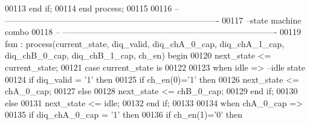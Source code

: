 \begin{DoxyCode}
00113     \textcolor{keywordflow}{end} \textcolor{keywordflow}{if}; 
00114 \textcolor{keywordflow}{end} \textcolor{keywordflow}{process};
00115 
00116 \textcolor{keyword}{-- ----------------------------------------------------------------------------}
00117 \textcolor{keyword}{--state machine combo}
00118 \textcolor{keyword}{-- ----------------------------------------------------------------------------}
00119 fsm : \textcolor{keywordflow}{process}(current_state, diq_valid, diq_chA_0_cap, diq_chA_1_cap, 
      diq_chB_0_cap, diq_chB_1_cap, ch_en) \textcolor{keywordflow}{begin}
00120     \textcolor{vhdlchar}{next_state} \textcolor{vhdlchar}{<=} \textcolor{vhdlchar}{current_state};
00121     \textcolor{keywordflow}{case} \textcolor{vhdlchar}{current_state} \textcolor{keywordflow}{is}
00122       
00123         \textcolor{keywordflow}{when} \textcolor{vhdlchar}{idle} \textcolor{vhdlchar}{=}\textcolor{vhdlchar}{>}\textcolor{keyword}{ --idle state}
00124          \textcolor{keywordflow}{if} \textcolor{vhdlchar}{diq_valid} \textcolor{vhdlchar}{=} \textcolor{vhdlchar}{'}\textcolor{vhdllogic}{}\textcolor{vhdllogic}{1}\textcolor{vhdlchar}{'} \textcolor{keywordflow}{then}
00125             \textcolor{keywordflow}{if} \textcolor{vhdlchar}{ch_en}\textcolor{vhdlchar}{(}\textcolor{vhdllogic}{}\textcolor{vhdllogic}{0}\textcolor{vhdlchar}{)}\textcolor{vhdlchar}{=}\textcolor{vhdlchar}{'}\textcolor{vhdllogic}{}\textcolor{vhdllogic}{1}\textcolor{vhdlchar}{'} \textcolor{keywordflow}{then} 
00126                \textcolor{vhdlchar}{next_state} \textcolor{vhdlchar}{<=} \textcolor{vhdlchar}{chA\_0\_cap};
00127             \textcolor{keywordflow}{else} 
00128                \textcolor{vhdlchar}{next_state} \textcolor{vhdlchar}{<=} \textcolor{vhdlchar}{chB\_0\_cap};
00129             \textcolor{keywordflow}{end} \textcolor{keywordflow}{if};
00130          \textcolor{keywordflow}{else} 
00131             \textcolor{vhdlchar}{next_state} \textcolor{vhdlchar}{<=} \textcolor{vhdlchar}{idle};
00132          \textcolor{keywordflow}{end} \textcolor{keywordflow}{if};
00133       
00134       \textcolor{keywordflow}{when} \textcolor{vhdlchar}{chA\_0\_cap} \textcolor{vhdlchar}{=}\textcolor{vhdlchar}{>} 
00135          \textcolor{keywordflow}{if} \textcolor{vhdlchar}{diq_chA_0_cap} \textcolor{vhdlchar}{=} \textcolor{vhdlchar}{'}\textcolor{vhdllogic}{}\textcolor{vhdllogic}{1}\textcolor{vhdlchar}{'} \textcolor{keywordflow}{then}
00136             \textcolor{keywordflow}{if} \textcolor{vhdlchar}{ch_en}\textcolor{vhdlchar}{(}\textcolor{vhdllogic}{}\textcolor{vhdllogic}{1}\textcolor{vhdlchar}{)}\textcolor{vhdlchar}{=}\textcolor{vhdlchar}{'}\textcolor{vhdllogic}{}\textcolor{vhdllogic}{0}\textcolor{vhdlchar}{'} \textcolor{keywordflow}{then} 

\end{DoxyCode}
